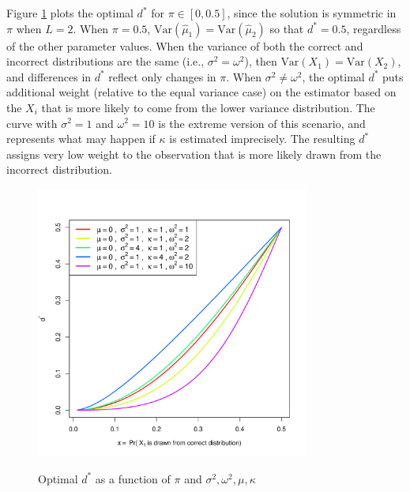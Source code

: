\documentclass[12pt]{article}
\newcommand{\Var}[1]{\text{Var}\left(#1\right)}
\begin{document}
Figure \ref{dStar} plots the optimal $d^*$ for $\pi\in[0,0.5]$, since the solution is symmetric in $\pi$ when $L=2$. When $\pi=0.5$, $\Var{\hat{\mu}_1}=\Var{\hat{\mu}_2}$ so that $d^*=0.5$, regardless of the other parameter values.  When the variance of both the correct and incorrect distributions are the same (i.e., $\sigma^2 = \omega^2$), then $\Var{X_1}=\Var{X_2}$, and differences in $d^*$ reflect only changes in $\pi$.   When $\sigma^2 \neq \omega^2$, the optimal $d^*$ puts additional weight (relative to the equal variance case) on the estimator based on the $X_i$ that is more likely to come from the lower variance distribution.  The curve with $\sigma^2 = 1$ and $\omega^2 = 10$ is the extreme version of this scenario, and represents what may happen if $\kappa$ is estimated imprecisely.  The resulting $d^*$ assigns very low weight to the observation that is more likely drawn from the incorrect distribution.  

\begin{figure}[htbp]
\begin{center}
\caption{Optimal $d^*$ as a function of $\pi$ and $\sigma^2, \omega^2, \mu, \kappa$}
\includegraphics[width=0.8\textwidth]{./Figures/dStar.pdf}
\label{dStar}
\end{center}
\end{figure}
\end{document}
